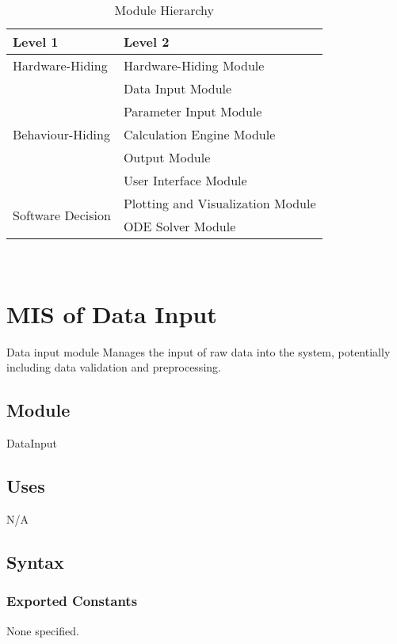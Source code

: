\documentclass[12pt, titlepage]{article}
\begin{document}
\begin{table}[h!]
\centering
\begin{tabular}{p{} p{}}
\toprule
\textbf{Level 1} & \textbf{Level 2}\\
\midrule

{Hardware-Hiding} & Hardware-Hiding Module \\
\midrule

\multirow{5}{0.3\textwidth}{Behaviour-Hiding} & Data Input Module\\
& Parameter Input Module\\
& Calculation Engine Module\\
& Output Module\\
& User Interface Module\\ 
\midrule

\multirow{2}{0.3\textwidth}{Software Decision} & {Plotting and Visualization Module}\\
& ODE Solver Module\\
\bottomrule

\end{tabular}
\caption{Module Hierarchy}
\label{TblMH}
\end{table}

\newpage
~\newpage

\section{MIS of Data Input} \label{mDI}

Data input module Manages the input of raw data into the system, potentially including data validation and preprocessing.

\subsection{Module}

DataInput

\subsection{Uses}
N/A

\subsection{Syntax}

\subsubsection{Exported Constants}
None specified.
\end{document}
